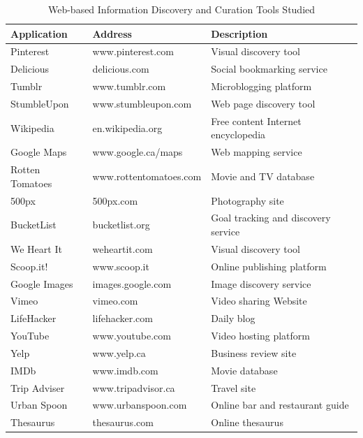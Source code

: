 \documentclass[review]{elsarticle}
\begin{document}
{\begin{table}[htbp]
\begin{tabular}{|p{}| p{}| p{}|}
\hline
\textbf{Application} & \textbf{Address} & \textbf{Description}
\\
\hline
Pinterest       & www.pinterest.com 	& Visual discovery tool \\
\hline
Delicious       & delicious.com 		& Social bookmarking service \\
\hline
Tumblr          & www.tumblr.com 		& Microblogging platform \\
\hline
StumbleUpon     & www.stumbleupon.com  	& Web page discovery tool \\
\hline
Wikipedia       & en.wikipedia.org   	& Free content Internet encyclopedia\\
\hline
Google Maps     & www.google.ca/maps  	& Web mapping service\\
\hline
Rotten Tomatoes & www.rottentomatoes.com & Movie and TV database\\
\hline
500px           & 500px.com            	& Photography site\\
\hline
BucketList      & bucketlist.org  		& Goal tracking and discovery service\\
\hline
We Heart It     & weheartit.com 		& Visual discovery tool \\
\hline
Scoop.it!       & www.scoop.it 			& Online publishing platform \\
\hline
Google Images   & images.google.com  	& Image discovery service \\
\hline
Vimeo           & vimeo.com  			& Video sharing Website\\
\hline
LifeHacker      & lifehacker.com        & Daily blog \\
\hline
YouTube         & www.youtube.com 		& Video hosting platform \\
\hline
Yelp            & www.yelp.ca  			& Business review site\\
\hline
IMDb            & www.imdb.com  		& Movie database \\
\hline
Trip Adviser    & www.tripadvisor.ca 	& Travel site \\
\hline
Urban Spoon     & www.urbanspoon.com    & Online bar and restaurant guide\\
\hline
Thesaurus       & thesaurus.com         & Online thesaurus \\
\hline
\end{tabular}
\caption{Web-based Information Discovery and Curation Tools Studied}
\label{table:tools} 
\end{table}
} %
\end{document}

